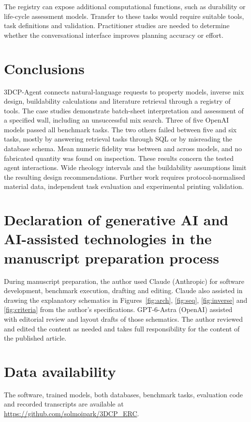 \documentclass[preprint,12pt]{elsarticle}
\begin{document}
The registry can expose additional computational functions, such as durability or life-cycle assessment models. Transfer to these tasks would require suitable tools, task definitions and validation. Practitioner studies are needed to determine whether the conversational interface improves planning accuracy or effort.

\section{Conclusions}\label{sec:conclusion}

3DCP-Agent connects natural-language requests to \nnModels{} property models, inverse mix design, buildability calculations and literature retrieval through a registry of \nnTools{} tools. The case studies demonstrate batch-sheet interpretation and assessment of a specified wall, including an unsuccessful mix search. Three of five OpenAI models passed all \nbenchCxN{} benchmark tasks. The two others failed between five and six tasks, mostly by answering retrieval tasks through SQL or by misreading the database schema. Mean numeric fidelity was between \nbenchCuFidelity{} and \nbenchCsFidelity{} across models, and no fabricated quantity was found on inspection. These results concern the tested agent interactions. Wide rheology intervals and the buildability assumptions limit the resulting design recommendations. Further work requires protocol-normalised material data, independent task evaluation and experimental printing validation.

\section*{Declaration of generative AI and AI-assisted technologies in the manuscript preparation process}
During manuscript preparation, the author used Claude (Anthropic) for software development, benchmark execution, drafting and editing. Claude also assisted in drawing the explanatory schematics in Figures~\ref{fig:arch}, \ref{fig:seq}, \ref{fig:inverse} and \ref{fig:criteria} from the author's specifications. GPT-6-Astra (OpenAI) assisted with editorial review and layout drafts of those schematics. The author reviewed and edited the content as needed and takes full responsibility for the content of the published article.

\section*{Data availability}
The software, trained models, both databases, benchmark tasks, evaluation code and recorded transcripts are available at \url{https://github.com/solmoipark/3DCP_ERC}.
\end{document}
